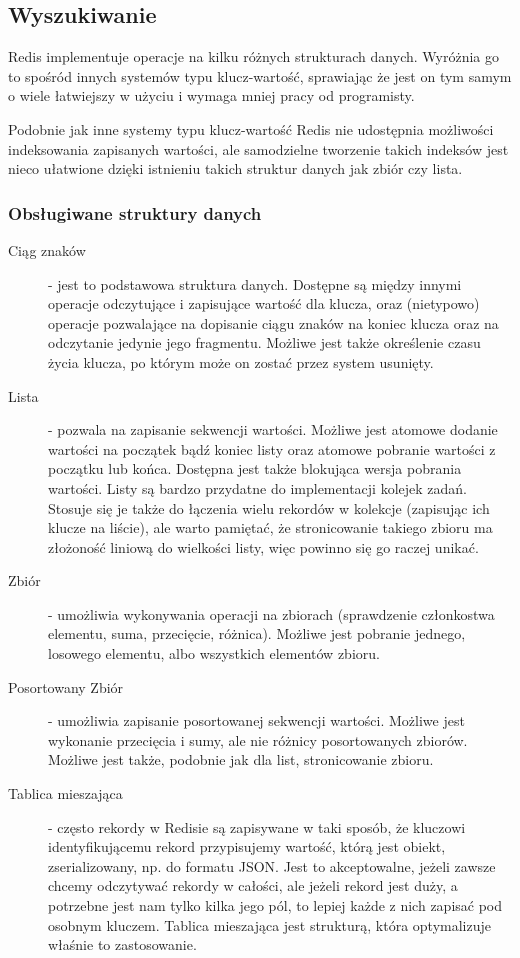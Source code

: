 \subsection*{Wyszukiwanie}

Redis implementuje operacje na kilku różnych strukturach danych.
Wyróżnia go to spośród innych systemów typu klucz-wartość, sprawiając że jest on tym samym o wiele łatwiejszy w użyciu i wymaga mniej pracy od programisty.

Podobnie jak inne systemy typu klucz-wartość Redis nie udostępnia możliwości indeksowania zapisanych wartości, ale samodzielne tworzenie takich indeksów jest nieco ułatwione dzięki istnieniu takich struktur danych jak zbiór czy lista.

\subsubsection*{Obsługiwane struktury danych}

\begin{description}
 \item[Ciąg znaków] - jest to podstawowa struktura danych.
 Dostępne są między innymi operacje odczytujące i zapisujące wartość dla klucza, oraz (nietypowo) operacje pozwalające na dopisanie ciągu znaków na koniec klucza oraz na odczytanie jedynie jego fragmentu.
 Możliwe jest także określenie czasu życia klucza, po którym może on zostać przez system usunięty.

 \item[Lista] - pozwala na zapisanie sekwencji wartości.
 Możliwe jest atomowe dodanie wartości na początek bądź koniec listy oraz atomowe pobranie wartości z początku lub końca.
 Dostępna jest także blokująca wersja pobrania wartości.
 Listy są bardzo przydatne do implementacji kolejek zadań.
 Stosuje się je także do łączenia wielu rekordów w kolekcje (zapisując ich klucze na liście), ale warto pamiętać, że stronicowanie takiego zbioru ma złożoność liniową do wielkości listy, więc powinno się go raczej unikać.

 \item[Zbiór] - umożliwia wykonywania operacji na zbiorach (sprawdzenie członkostwa elementu, suma, przecięcie, różnica).
 Możliwe jest pobranie jednego, losowego elementu, albo wszystkich elementów zbioru.

 \item[Posortowany Zbiór] - umożliwia zapisanie posortowanej sekwencji wartości.
 Możliwe jest wykonanie przecięcia i sumy, ale nie różnicy posortowanych zbiorów.
 Możliwe jest także, podobnie jak dla list, stronicowanie zbioru.

 \item[Tablica mieszająca] - często rekordy w Redisie są zapisywane w taki sposób, że kluczowi identyfikującemu rekord przypisujemy wartość, którą jest obiekt, zserializowany, np. do formatu JSON.
 Jest to akceptowalne, jeżeli zawsze chcemy odczytywać rekordy w całości, ale jeżeli rekord jest duży, a potrzebne jest nam tylko kilka jego pól, to lepiej każde z nich zapisać pod osobnym kluczem.
 Tablica mieszająca jest strukturą, która optymalizuje właśnie to zastosowanie.
\end{description}

